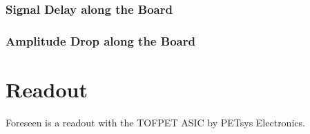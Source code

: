\documentclass[12pt,a4paper,oneside]{article}
\begin{document}
\subsubsection{Signal Delay along the Board}

\subsubsection{Amplitude Drop along the Board}


\section{Readout}

Foreseen is a readout with the TOFPET ASIC by PETsys Electronics.


\newpage
\listoftodos
\end{document}
